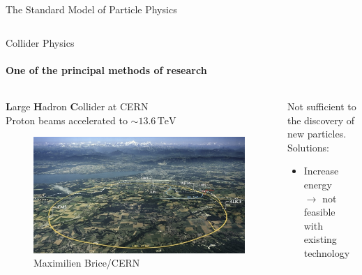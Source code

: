 \begin{frame}{The Standard Model of Particle Physics}
\begin{columns}
\begin{column}{0.5 \textwidth}
      \vspace{0.5em}


      

    \end{column}

  \end{columns}

\end{frame}


\begin{frame} {Collider Physics}
  \framesubtitle{One of the principal methods of research}

   \begin{columns}
  
    \begin{column}{0.5\textwidth}
    \textbf{L}arge \textbf{H}adron \textbf{C}ollider at CERN \\
    Proton beams accelerated to $\sim 13.6 \, \text{TeV}$ \\

      \begin{figure}
        \centering
        \includegraphics[width=\textwidth]{imgs/lhc.jpeg}
        \caption{ Maximilien Brice/CERN}
      \end{figure}
    \end{column}


    \begin{column}{0.5\textwidth}
        \begin{centering}
            Not sufficient to the discovery of new particles. \\

            \vspace{2.0em}
        Solutions: 
        \vspace{0.8em}
        \begin{itemize}
        \item Increase energy \\$\to$ not feasible with existing technology
        \end{itemize}
        \end{centering}


\end{column}
\end{columns}
\end{frame}
